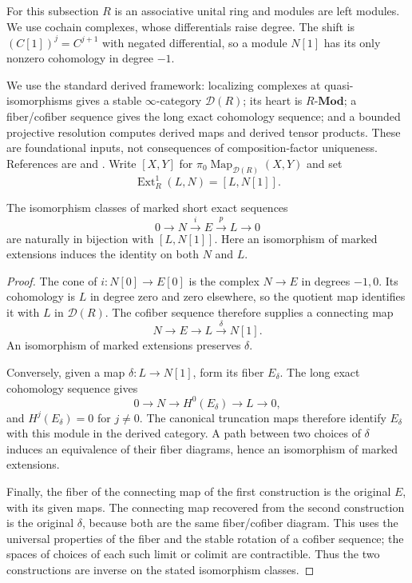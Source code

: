 For this subsection $R$ is an associative unital ring and modules are left
modules.  We use cochain complexes, whose differentials raise degree.
The shift is $(C[1])^j=C^{j+1}$ with negated differential, so a module
$N[1]$ has its only nonzero cohomology in degree $-1$.

We use the standard derived framework: localizing complexes at
quasi-isomorphisms gives a stable $\infty$-category $\mathcal D(R)$;
its heart is $R\text{-}\mathbf{Mod}$; a fiber/cofiber sequence gives the
long exact cohomology sequence; and a bounded projective resolution
computes derived maps and derived tensor products.  These are foundational
inputs, not consequences of composition-factor uniqueness.  References
are \cite[\S1.3]{HA} and \cite[Tags 06XP, 0643]{Stacks}.
Write $[X,Y]$ for $\pi_0\operatorname{Map}_{\mathcal D(R)}(X,Y)$ and set
\[
 \operatorname{Ext}^1_R(L,N)=[L,N[1]].
\]

\begin{theorem}
\label{t:extension-classification}
The isomorphism classes of marked short exact sequences
\[
 0\longrightarrow N\xrightarrow{i}E\xrightarrow{p}L\longrightarrow0
\]
are naturally in bijection with $[L,N[1]]$.  Here an isomorphism of marked
extensions induces the identity on both $N$ and $L$.
\end{theorem}
\begin{proof}
The cone of $i:N[0]\to E[0]$ is the complex $N\to E$ in degrees
$-1,0$.  Its cohomology is $L$ in degree zero and zero elsewhere, so
the quotient map identifies it with $L$ in $\mathcal D(R)$.  The cofiber
sequence therefore supplies a connecting map
\[
 N\longrightarrow E\longrightarrow L\xrightarrow{\delta}N[1].
\]
An isomorphism of marked extensions preserves $\delta$.

Conversely, given a map $\delta:L\to N[1]$, form its fiber $E_\delta$.
The long exact cohomology sequence gives
\[
 0\longrightarrow N\longrightarrow H^0(E_\delta)
 \longrightarrow L\longrightarrow0,
\]
and $H^j(E_\delta)=0$ for $j\neq0$.  The canonical truncation maps
therefore identify $E_\delta$ with this module in the derived category.
A path between two choices of $\delta$ induces an equivalence of their
fiber diagrams, hence an isomorphism of marked extensions.

Finally, the fiber of the connecting map of the first construction is
the original $E$, with its given maps.  The connecting map recovered
from the second construction is the original $\delta$, because both
are the same fiber/cofiber diagram.  This uses the universal properties
of the fiber and the stable rotation of a cofiber sequence; the spaces
of choices of each such limit or colimit are contractible.  Thus the
two constructions are inverse on the stated isomorphism classes.
\end{proof}

